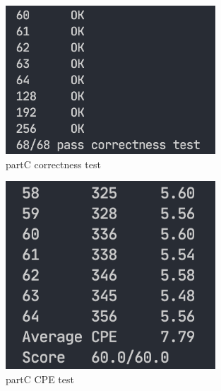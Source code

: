 \documentclass{article}
\begin{document}
\begin{figure}[H] %
        \centering %
        \includegraphics[width=0.7\textwidth]{partC-correctness-test.png} %
        \caption{partC correctness test} %
        \label{Fig.partC-correctness} %
\end{figure}
\begin{figure}[H] %
        \centering %
        \includegraphics[width=0.7\textwidth]{partC-CPE-test.png} %
        \caption{partC CPE test} %
        \label{Fig.partC-CPE} %
\end{figure}
\end{document}

